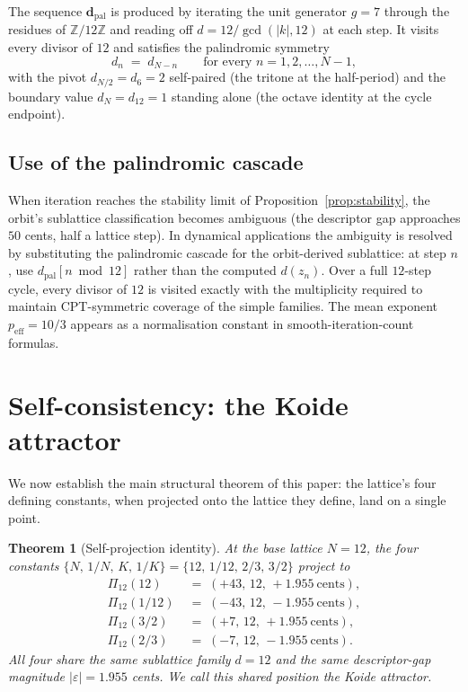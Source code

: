 \documentclass[11pt,a4paper]{article}
\newtheorem{theorem}{Theorem}[section]
\theoremstyle{definition}
\theoremstyle{remark}
\newcommand{\Z}{\mathbb{Z}}
\newcommand{\eps}{\varepsilon}
\begin{document}
The sequence $\mathbf{d}_{\mathrm{pal}}$ is produced by iterating the unit generator $g=7$ through the residues of $\Z/12\Z$ and reading off $d = 12/\gcd(|k|,12)$ at each step. It visits every divisor of $12$ and satisfies the palindromic symmetry
\begin{equation}\label{eq:palindrome}
d_{n} \;=\; d_{N-n} \qquad\text{for every } n = 1,2,\ldots,N-1,
\end{equation}
with the pivot $d_{N/2}=d_{6}=2$ self-paired (the tritone at the half-period) and the boundary value $d_{N}=d_{12}=1$ standing alone (the octave identity at the cycle endpoint).

\subsection{Use of the palindromic cascade}

When iteration reaches the stability limit of Proposition~\ref{prop:stability}, the orbit's sublattice classification becomes ambiguous (the descriptor gap approaches $50$ cents, half a lattice step). In dynamical applications the ambiguity is resolved by substituting the palindromic cascade for the orbit-derived sublattice: at step $n$, use $d_{\mathrm{pal}}[n\bmod 12]$ rather than the computed $d(z_{n})$. Over a full $12$-step cycle, every divisor of $12$ is visited exactly with the multiplicity required to maintain CPT-symmetric coverage of the simple families. The mean exponent $p_{\mathrm{eff}}=10/3$ appears as a normalisation constant in smooth-iteration-count formulas.

\section{Self-consistency: the Koide attractor}\label{sec:selfcons}

We now establish the main structural theorem of this paper: the lattice's four defining constants, when projected onto the lattice they define, land on a single point.

\begin{theorem}[Self-projection identity]\label{thm:self}
At the base lattice $N=12$, the four constants $\{N,\,1/N,\,K,\,1/K\}=\{12,\,1/12,\,2/3,\,3/2\}$ project to
\begin{align*}
\Pi_{12}(12) &\;=\; (+43,\,12,\,+1.955\ \mathrm{cents}),\\
\Pi_{12}(1/12) &\;=\; (-43,\,12,\,-1.955\ \mathrm{cents}),\\
\Pi_{12}(3/2) &\;=\; (+7,\,12,\,+1.955\ \mathrm{cents}),\\
\Pi_{12}(2/3) &\;=\; (-7,\,12,\,-1.955\ \mathrm{cents}).
\end{align*}
All four share the same sublattice family $d=12$ and the same descriptor-gap magnitude $|\eps|=1.955$ cents. We call this shared position the \emph{Koide attractor}.
\end{theorem}
\end{document}

